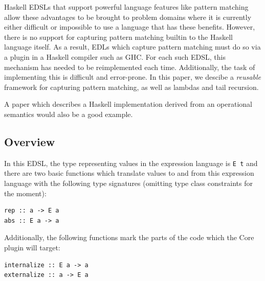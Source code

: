 \documentclass[runningheads, a4paper]{llncs}
\newcommand{\ttt}{\texttt}
\newenvironment{todont}
               {\comment}
               {\endcomment}
\begin{document}
Haskell EDSLs that support powerful language features like pattern matching
allow these advantages to be brought to problem domains where it is currently
either difficult or impossible to use a language that has these benefits.
However, there is no support for capturing pattern matching builtin to the Haskell
language itself. As a result, EDLs which capture pattern matching must do so
via a plugin in a Haskell compiler such as GHC. For each such EDSL, this mechanism
has needed to be reimplemented each time. Additionally, the task of implementing this
is difficult and error-prone. In this paper, we descibe a \textit{reusable}
framework for capturing pattern matching, as well as lambdas and tail recursion.


\begin{todont}

  A paper which describes a Haskell implementation derived from an operational
  semantics would also be a good example.
\end{todont}

\subsection{Overview}
\label{sec:Overview}

In this EDSL, the type representing values in the expression language is \ttt{E
t} and there are two basic functions which translate values to and from this
expression language with the following type signatures (omitting type class
constraints for the moment):

\begin{lstlisting}
rep :: a -> E a
abs :: E a -> a
\end{lstlisting}

Additionally, the following functions mark the parts of the code which the Core
plugin will target:

\begin{lstlisting}
internalize :: E a -> a
externalize :: a -> E a
\end{lstlisting}
\end{document}

